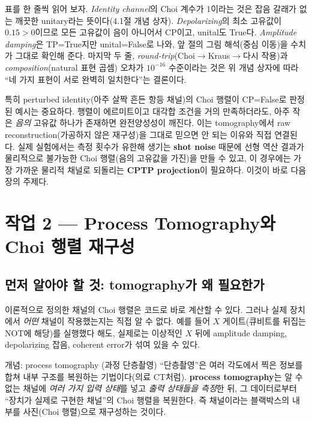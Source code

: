 \documentclass[11pt,a4paper]{article}
\begin{document}
표를 한 줄씩 읽어 보자. \emph{Identity channel}의 Choi 계수가 1이라는 것은 잡음 갈래가 없는 깨끗한 unitary라는 뜻이다(4.1절 개념 상자). \emph{Depolarizing}의 최소 고유값이 $0.15>0$이므로 모든 고유값이 음이 아니어서 CP이고, unital도 True다. \emph{Amplitude damping}은 TP=True지만 unital=False로 나와, 앞 절의 그림 해석(중심 이동)을 수치가 그대로 확인해 준다. 마지막 두 줄, \emph{round-trip}(Choi$\to$Kraus$\to$다시 작용)과 \emph{composition}(natural 표현 곱셈) 오차가 $10^{-16}$ 수준이라는 것은 위 개념 상자에 따라 ``네 가지 표현이 서로 완벽히 일치한다''는 결론이다.

특히 perturbed identity(아주 살짝 흔든 항등 채널)의 Choi 행렬이 CP=False로 판정된 예시는 중요하다. 행렬이 에르미트이고 대각합 조건을 거의 만족하더라도, 아주 작은 \emph{음의} 고유값 하나가 존재하면 완전양성성이 깨진다. 이는 tomography에서 raw reconstruction(가공하지 않은 재구성)을 그대로 믿으면 안 되는 이유와 직접 연결된다. 실제 실험에서는 측정 횟수가 유한해 생기는 \textbf{shot noise} 때문에 선형 역산 결과가 물리적으로 불가능한 Choi 행렬(음의 고유값을 가진)을 만들 수 있고, 이 경우에는 가장 가까운 물리적 채널로 되돌리는 \textbf{CPTP projection}이 필요하다. 이것이 바로 다음 장의 주제다.

\section{작업 2 --- Process Tomography와 Choi 행렬 재구성}

\subsection{먼저 알아야 할 것: tomography가 왜 필요한가}

이론적으로 정의한 채널의 Choi 행렬은 코드로 바로 계산할 수 있다. 그러나 실제 장치에서 \emph{어떤} 채널이 작용했는지는 직접 알 수 없다. 예를 들어 $X$ 게이트(큐비트를 뒤집는 NOT에 해당)를 실행했다 해도, 실제로는 이상적인 $X$ 뒤에 amplitude damping, depolarizing 잡음, coherent error가 섞여 있을 수 있다.

\begin{conceptbox}{개념: process tomography (과정 단층촬영)}
``단층촬영''은 여러 각도에서 찍은 정보를 합쳐 내부 구조를 복원하는 기법이다(의료 CT처럼). \textbf{process tomography}는 알 수 없는 채널에 \emph{여러 가지 입력 상태}를 넣고 \emph{출력 상태들을 측정}한 뒤, 그 데이터로부터 ``장치가 실제로 구현한 채널''의 Choi 행렬을 복원한다. 즉 채널이라는 블랙박스의 내부를 사진(Choi 행렬)으로 재구성하는 것이다.
\end{conceptbox}
\end{document}
